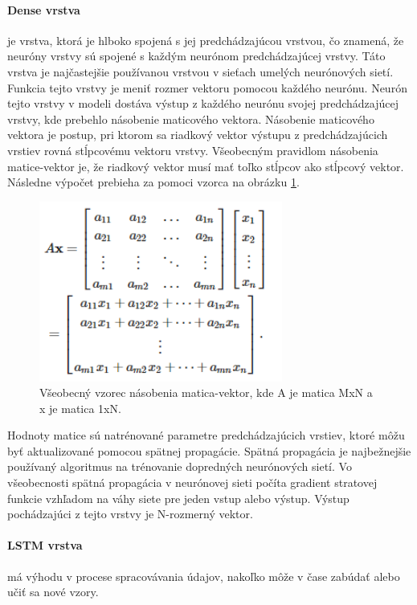\paragraph{Dense vrstva} je vrstva, ktorá je hlboko spojená s jej predchádzajúcou vrstvou, čo znamená, že neuróny vrstvy sú spojené s každým neurónom predchádzajúcej vrstvy. Táto vrstva je najčastejšie používanou vrstvou v sieťach umelých neurónových sietí. Funkcia tejto vrstvy je meniť rozmer vektoru pomocou každého neurónu.
Neurón tejto vrstvy v modeli dostáva výstup z každého neurónu svojej predchádzajúcej vrstvy, kde prebehlo násobenie maticového vektora. Násobenie maticového vektora je postup, pri ktorom sa riadkový vektor výstupu z predchádzajúcich vrstiev rovná stĺpcovému vektoru vrstvy. Všeobecným pravidlom násobenia matice-vektor je, že riadkový vektor musí mať toľko stĺpcov ako stĺpcový vektor. Následne výpočet prebieha za pomoci vzorca na obrázku \ref{maticavektor}.

\begin{figure}[!htbp]
  \centering
  \includegraphics[width=8cm]{img/dense.png}
  \caption{Všeobecný vzorec násobenia matica-vektor, kde A je matica MxN a x je matica 1xN.}
  \label{maticavektor}
\end{figure}

Hodnoty matice sú natrénované parametre predchádzajúcich vrstiev, ktoré môžu byť aktualizované pomocou spätnej propagácie. Spätná propagácia je najbežnejšie používaný algoritmus na trénovanie dopredných neurónových sietí. Vo všeobecnosti spätná propagácia v neurónovej sieti počíta gradient stratovej funkcie vzhľadom na váhy siete pre jeden vstup alebo výstup. Výstup pochádzajúci z tejto vrstvy je N-rozmerný vektor.

\paragraph{LSTM vrstva} má výhodu v procese spracovávania údajov, nakoľko môže v čase zabúdať alebo učiť sa nové vzory. 

